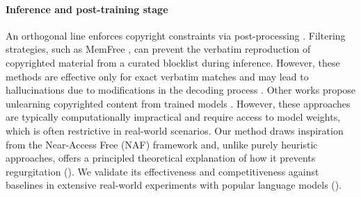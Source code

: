 \paragraph{Inference and post-training stage} An orthogonal line enforces copyright constraints via post-processing \citep{wei2024evaluating}. Filtering strategies, such as MemFree \citep{ippolito2023donottrain}, can prevent the verbatim reproduction of copyrighted material from a curated blocklist during inference. However, these methods are effective only for exact verbatim matches and may lead to hallucinations due to modifications in the decoding process \citep{liu2024shield}. Other works propose unlearning copyrighted content from trained models \citep{bourtoule2021machine, chen2023unlearn, eldan2023s, jang2023knowledge, zhang2024negative, liu2024rethinking}. However, these approaches are typically computationally impractical and require access to model weights, which is often restrictive in real-world scenarios. Our method draws inspiration from the Near-Access Free (NAF) framework \citep{vyas2023provable} and, unlike purely heuristic approaches, offers a principled theoretical explanation of how it prevents regurgitation (). We validate its effectiveness and competitiveness against baselines in extensive real-world experiments with popular language models  ().





